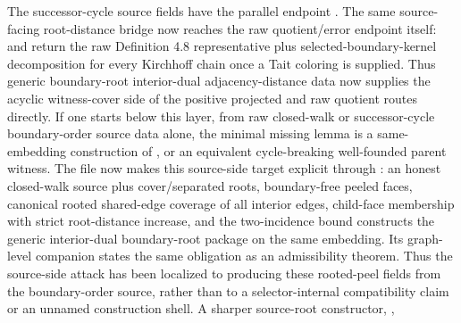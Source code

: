 \documentclass[11pt]{article}
\begin{document}
The successor-cycle source fields have the parallel endpoint
.
The same source-facing root-distance bridge now reaches the raw
quotient/error endpoint itself:
and
return the raw Definition 4.8 representative plus selected-boundary-kernel
decomposition for every Kirchhoff chain once a Tait coloring is supplied.
Thus generic boundary-root interior-dual adjacency-distance data now supplies
the acyclic witness-cover side of the positive projected and raw quotient
routes directly.  If one starts below this layer, from raw closed-walk or successor-cycle
boundary-order source data alone, the minimal missing lemma is a same-embedding
construction of , or an
equivalent cycle-breaking well-founded parent witness.  The file
 now makes this
source-side target explicit through
:
an honest closed-walk source plus cover/separated roots, boundary-free peeled
faces, canonical rooted shared-edge coverage of all interior edges, child-face
membership with strict root-distance increase, and the two-incidence bound
constructs the generic interior-dual boundary-root package on the same
embedding.  Its graph-level companion
states the same obligation as an admissibility theorem.  Thus the source-side
attack has been localized to producing these rooted-peel fields from the
boundary-order source, rather than to a selector-internal compatibility claim
or an unnamed construction shell.  A sharper source-root constructor,
,
\end{document}
